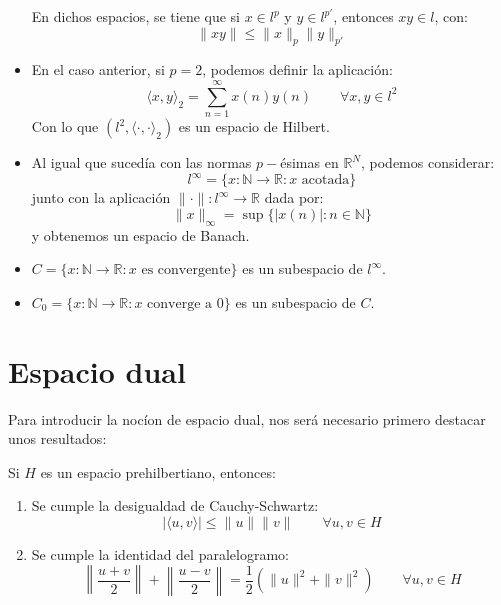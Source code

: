 \begin{itemize}
        En dichos espacios, se tiene que si $x\in l^p$ y $y\in l^{p'}$, entonces $xy\in l$, con:
        \begin{equation*}
            \|xy\| \leq \|x\|_p \|y\|_{p'}
        \end{equation*}
    \item En el caso anterior, si $p=2$, podemos definir la aplicación:
        \begin{equation*}
            \langle x,y \rangle_2 = \sum_{n=1}^{\infty}x(n)y(n) \qquad \forall x,y\in l^2
        \end{equation*}
        Con lo que $(l^2, \langle \cdot ,\cdot  \rangle _2)$ es un espacio de Hilbert.
    \item Al igual que sucedía con las normas $p-$ésimas en $\mathbb{R}^N$, podemos considerar:
        \begin{equation*}
            l^\infty = \{x:\mathbb{N}\to \mathbb{R} : x \text{\ acotada}\}
        \end{equation*}
        junto con la aplicación $\|\cdot \|:l^{\infty}\to \mathbb{R}$ dada por:
        \begin{equation*}
            \|x\|_\infty = \sup\{|x(n)| : n\in \mathbb{N}\}
        \end{equation*}
        y obtenemos un espacio de Banach.
    \item $C = \{x:\mathbb{N}\to \mathbb{R} : x \text{\ es convergente}\}$ es un subespacio de $l^\infty$.
    \item $C_0 = \{x:\mathbb{N}\to \mathbb{R} : x \text{\ converge a\ }0\}$ es un subespacio de $C$.
\end{itemize}

\section{Espacio dual}
Para introducir la nocíon de espacio dual, nos será necesario primero destacar unos resultados:
\begin{prop}
    Si $H$ es un espacio prehilbertiano, entonces:
    \begin{enumerate}
        \item Se cumple la desigualdad de Cauchy-Schwartz:
            \begin{equation*}
                |\langle u,v \rangle | \leq \|u\|\|v\| \qquad \forall u,v\in H
            \end{equation*}
        \item Se cumple la identidad del paralelogramo:
            \begin{equation*}
                \left\|\dfrac{u+v}{2}\right\| + \left\| \dfrac{u-v}{2}\right\| = \dfrac{1}{2}(\|u\|^2 + \|v\|^2) \qquad \forall u,v\in H
            \end{equation*}
    \end{enumerate}
\end{prop}

